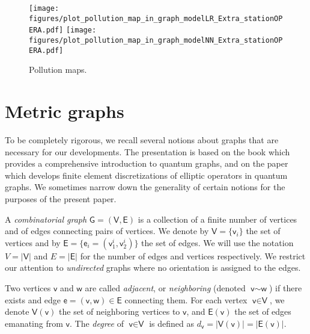 \documentclass[11pt,a4paper,twoside]{article}
\theoremstyle{definition}
\numberwithin{equation}{section}
\newcommand{\G}{\ensuremath{\textsf{G}}} %
\newcommand{\E}{\ensuremath{\textsf{E}}} %
\newcommand{\V}{\ensuremath{\textsf{V}}} %
\newcommand{\vv}{\ensuremath{\textsf{v}}}
\newcommand{\ww}{\ensuremath{\textsf{w}}}
\newcommand{\ee}{\ensuremath{\textsf{e}}}
\newcommand{\<}{\langle}
\renewcommand{\>}{\rangle}
\begin{document}
\begin{figure}
    \centering
    \texttt{[image: figures/plot\_pollution\_map\_in\_graph\_modelLR\_Extra\_stationOPERA.pdf]}
    \texttt{[image: figures/plot\_pollution\_map\_in\_graph\_modelNN\_Extra\_stationOPERA.pdf]}
    \caption{Pollution maps.}
    \label{fig:pollutionmaps}
\end{figure}

\appendix
\section{Metric graphs}
\label{sec:metric-graphs}
To be completely rigorous, we recall several notions about graphs that are necessary for our developments. The presentation is based on the book \cite{BK2013} which provides a comprehensive introduction to quantum graphs, and on the paper \cite{AB2018} which develops finite element discretizations of elliptic operators in quantum graphs. We sometimes narrow down the generality of certain notions for the purposes of the present paper.

A \emph{combinatorial graph} $\G = (\V, \E)$ is a collection of a finite number of vertices and of edges connecting pairs of vertices. We denote by $\V=\{\vv_i\}$ the set of vertices and by $\E=\{\ee_i=(\vv_1^i, \vv_2^i) \}$ the set of edges. We will use the notation $V = |\V|$ and $E=|\E|$ for the number of edges and vertices respectively. We restrict our attention to \emph{undirected} graphs where no orientation is assigned to the edges. %

Two vertices $\vv$ and $\ww$ are called \emph{adjacent}, or \emph{neighboring} (denoted $\vv\sim \ww$) if there exists and edge $\ee=(\vv,\ww)\in \E$ connecting them. For each vertex $\vv\in \V$, we denote $\V(\vv)$ the set of neighboring vertices to $\vv$, and $\E(\vv)$ the set of edges emanating from $\vv$. The \emph{degree} of $\vv\in \V$ is defined as $d_\vv = | \V(\vv)| = |\E(\vv)|$.
\end{document}
